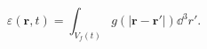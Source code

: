 \begin{equation}
\varepsilon(\mathbf{r},t) = \int_{V_f(t)}{g(|\mathbf{r} -
\mathbf{r'}|) \dd^3 r' }.
 \label{eq:voidfraction}
\end{equation}
